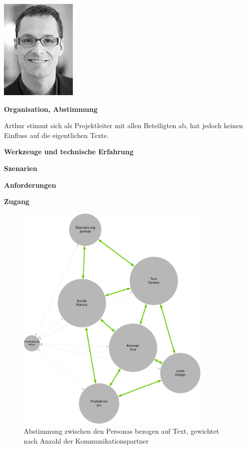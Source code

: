 \begin{multicols}{2}

\begin{center}
\includegraphics[width=0.5\columnwidth]{media/arthur.jpg}
\end{center}


\textbf{Organisation, Abstimmung}

Arthur stimmt sich als Projektleiter mit allen Beteiligten ab, hat jedoch keinen Einfluss auf die eigentlichen Texte.

\textbf{Werkzeuge und technische Erfahrung}

\columnbreak

\textbf{Szenarien}

\textbf{Anforderungen}

\textbf{Zugang}

\end{multicols}

\pagebreak

\begin{figure}[htb]
\begin{center}
\includegraphics[width=0.85\textwidth]{media/personas-gewichtet.pdf}
\caption{Abstimmung zwischen den Personas bezogen auf Text, gewichtet nach Anzahl der Kommunikationspartner}
\label{chart:personas-gewichtet}
\end{center}
\end{figure}